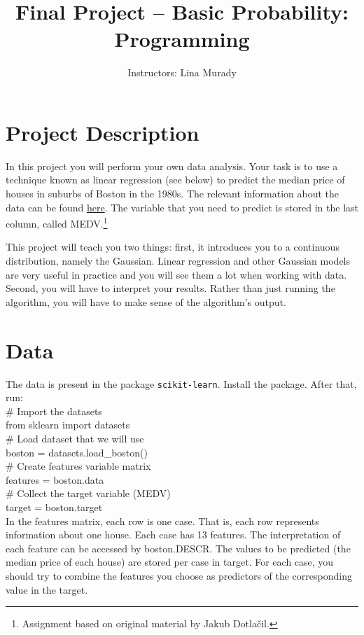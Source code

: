 \documentclass[11pt, leqno, a4paper]{article}
\title{Final Project -- Basic Probability: Programming}
\author{Instructors: Lina Murady}
\begin{document}
\maketitle

\section{Project Description}

In this project you will perform your own data analysis. Your task is
to use a technique known as linear regression (see below) to predict the median price of houses
in suburbs of Boston in the 1980s. The relevant information about the data can be found
\href{http://www.cs.toronto.edu/\%7Edelve/data/boston/bostonDetail.html}{here}. The variable that you need
to predict is stored in the last column, called MEDV.\footnote{Assignment based on original material by Jakub Dotla\v{c}il.}

This project will teach you two things: first, it introduces you to a continuous distribution, namely
the Gaussian. Linear regression and other Gaussian models are very useful in practice and you will
see them a lot when working with data. Second, you will have to interpret your results. Rather than
just running the algorithm, you will have to make sense of the algorithm's output.
\section{Data}

The data is present in the package \texttt{scikit-learn}. Install the package. After that, run:\\
\# Import the datasets\\
from sklearn import datasets\\[1em]
\# Load dataset that we will use\\
boston = datasets.load\_boston()\\[1em]
\# Create features variable matrix\\
features = boston.data\\[1em]
\# Collect the target variable (MEDV)\\
target = boston.target\\[1em]

In the features matrix, each row is one case. That is, each row represents information about one house. Each case has 13 features. The interpretation of each feature can be accessed by boston.DESCR. The values to be predicted (the median price of each house) are stored per case in target. For each case, you should try to combine the features you choose as predictors of the corresponding value in the target.
\end{document}
